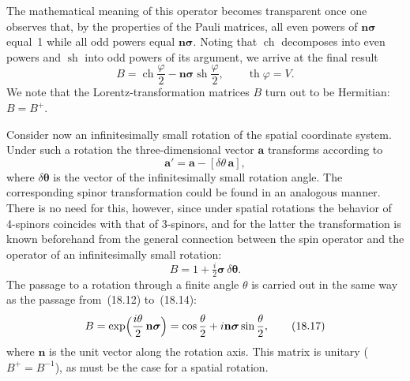 The mathematical meaning of this operator becomes transparent once one observes that, by the properties of the Pauli matrices, all even powers of $\mathbf{n}\boldsymbol{\sigma}$ equal~1 while all odd powers equal $\mathbf{n}\boldsymbol{\sigma}$. Noting that $\operatorname{ch}$ decomposes into even powers and $\operatorname{sh}$ into odd powers of its argument, we arrive at the final result
\begin{equation}
B = \operatorname{ch}\frac{\varphi}{2} - \mathbf{n}\boldsymbol{\sigma}\operatorname{sh}\frac{\varphi}{2},\qquad \operatorname{th}\varphi = V.
\tag{18.14}
\end{equation}
We note that the Lorentz-transformation matrices $B$ turn out to be Hermitian: $B = B^+$.

Consider now an infinitesimally small rotation of the spatial coordinate system. Under such a rotation the three-dimensional vector $\mathbf{a}$ transforms according to
\begin{equation}
\mathbf{a}' = \mathbf{a} - [\delta\theta\,\mathbf{a}],
\tag{18.15}
\end{equation}
where $\delta\boldsymbol\theta$ is the vector of the infinitesimally small rotation angle. The corresponding spinor transformation could be found in an analogous manner. There is no need for this, however, since under spatial rotations the behavior of 4-spinors coincides with that of 3-spinors, and for the latter the transformation is known beforehand from the general connection between the spin operator and the operator of an infinitesimally small rotation:
\begin{equation}
B = 1 + \tfrac{i}{2}\boldsymbol{\sigma}\,\delta\boldsymbol\theta.
\tag{18.16}
\end{equation}
The passage to a rotation through a finite angle $\theta$ is carried out in the same way as the passage from~(18.12) to~(18.14):
\begin{equation}
B = \exp\Bigl(\frac{i\theta}{2}\,\mathbf{n}\boldsymbol{\sigma}\Bigr) = \cos\frac{\theta}{2} + i\mathbf{n}\boldsymbol{\sigma}\sin\frac{\theta}{2},
\tag{18.17}
\end{equation}
where $\mathbf{n}$ is the unit vector along the rotation axis. This matrix is unitary ($B^+ = B^{-1}$), as must be the case for a spatial rotation.
